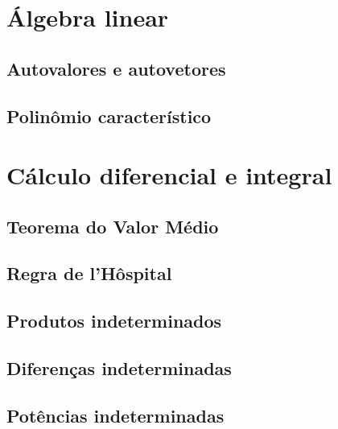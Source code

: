 \documentclass[12pt, a4paper]{article}
\begin{document}
	
	
	\section{Álgebra linear}
		\subsection{Autovalores e autovetores}
		
		
		\subsection{Polinômio característico}
		
	
	\section{Cálculo diferencial e integral}
		\subsection{Teorema do Valor Médio}
			
	
		\subsection{Regra de l'Hôspital}
		

		\subsection{Produtos indeterminados}
		
		
		\subsection{Diferenças indeterminadas}
		
	
		\subsection{Potências indeterminadas}
		
		
	
\end{document}
